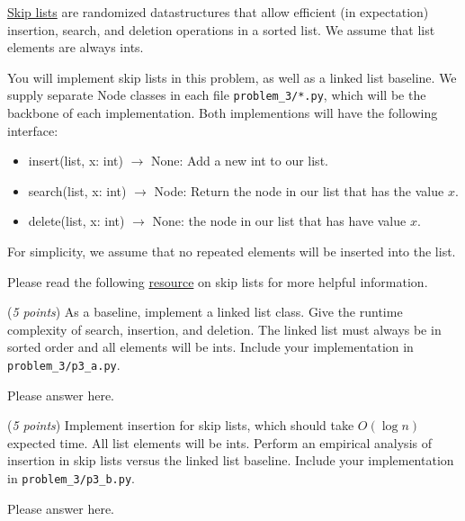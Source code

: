 \documentclass{hw}
\begin{document}
\begin{problem}
\href{https://en.wikipedia.org/wiki/Skip_list}{Skip lists}
are randomized datastructures that allow efficient (in expectation)
insertion, search, and deletion operations in a sorted list.
We assume that list elements are always ints.

You will implement skip lists in this problem, as well as a linked list baseline.
We supply separate Node classes in each file \texttt{problem\_3/*.py}, which will be the backbone of each implementation.
Both implementions will have the following interface:
\begin{itemize}
\item insert(list, x: int) $\rightarrow$ None: Add a new int to our list.
\item search(list, x: int) $\rightarrow$ Node: Return the node in our list that has the value $x$.
\item delete(list, x: int) $\rightarrow$ None: the node in our list that has have value $x$.
\end{itemize}
For simplicity, we assume that no repeated elements will be inserted into the list.

Please read the following
\href{https://ocw.mit.edu/courses/6-046j-introduction-to-algorithms-sma-5503-fall-2005/resources/l12_skiplists/}{resource}
on skip lists for more helpful information.

\begin{subproblem}
(\textit{5 points}) As a baseline, implement a linked list class.
Give the runtime complexity of search, insertion, and deletion.
The linked list must always be in sorted order and all elements will be ints.
Include your implementation in \texttt{problem\_3/p3\_a.py}.
\end{subproblem}
\begin{solution}
Please answer here.
\end{solution}


\begin{subproblem}
(\textit{5 points}) Implement insertion for skip lists, which should take $O(\log n)$ expected time.
All list elements will be ints.
Perform an empirical analysis of insertion in skip lists versus the linked list baseline.
Include your implementation in \texttt{problem\_3/p3\_b.py}.
\end{subproblem}
\begin{solution}
Please answer here.
\end{solution}



\end{problem}
\end{document}
